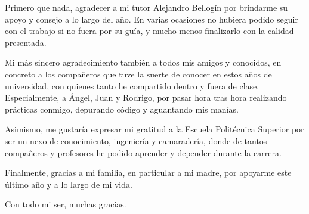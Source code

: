 Primero que nada, agradecer a mi tutor Alejandro Bellogín por brindarme su apoyo y consejo a lo largo del año. En varias ocasiones no hubiera podido seguir con el trabajo si no fuera por su guía, y mucho menos finalizarlo con la calidad presentada.

Mi más sincero agradecimiento también a todos mis amigos y conocidos, en concreto a los compañeros que tuve la suerte de conocer en estos años de universidad, con quienes tanto he compartido dentro y fuera de clase. Especialmente, a Ángel, Juan y Rodrigo, por pasar hora tras hora realizando prácticas conmigo, depurando código y aguantando mis manías.

Asimismo, me gustaría expresar mi gratitud a la Escuela Politécnica Superior por ser un nexo de conocimiento, ingeniería y camaradería, donde de tantos compañeros y profesores he podido aprender y depender durante la carrera.

Finalmente, gracias a mi familia, en particular a mi madre, por apoyarme este último año y a lo largo de mi vida.

Con todo mi ser, muchas gracias.